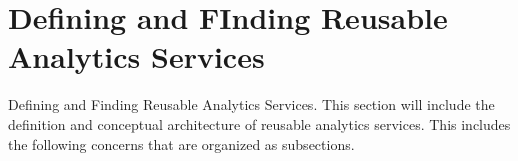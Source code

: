 
\section{Defining and FInding Reusable Analytics Services}
\label{sec:defining}

Defining and Finding Reusable Analytics Services. This section will include
the definition and conceptual architecture of reusable analytics services. This includes the
following concerns that are organized as subsections.
